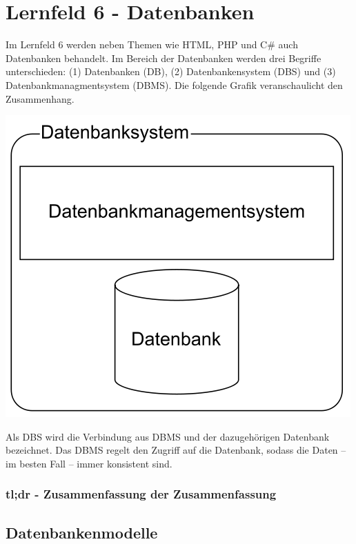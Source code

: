 \section{Lernfeld 6 - Datenbanken}

Im Lernfeld 6 werden neben Themen wie HTML, PHP und C\# auch Datenbanken behandelt. Im Bereich der Datenbanken werden drei Begriffe unterschieden: (1) Datenbanken (DB), (2) Datenbankensystem (DBS) und (3) Datenbankmanagmentsystem (DBMS). Die folgende Grafik veranschaulicht den Zusammenhang.

\includegraphics[scale=0.4]{pictures/lf06db-pic/lf06db-begriffszusammenhang.png}

Als DBS wird die Verbindung aus DBMS und der dazugehörigen Datenbank bezeichnet. Das DBMS regelt den Zugriff auf die Datenbank, sodass die Daten -- im besten Fall -- immer konsistent sind. 

\subsubsection{tl;dr - Zusammenfassung der Zusammenfassung}


\subsection{Datenbankenmodelle}

